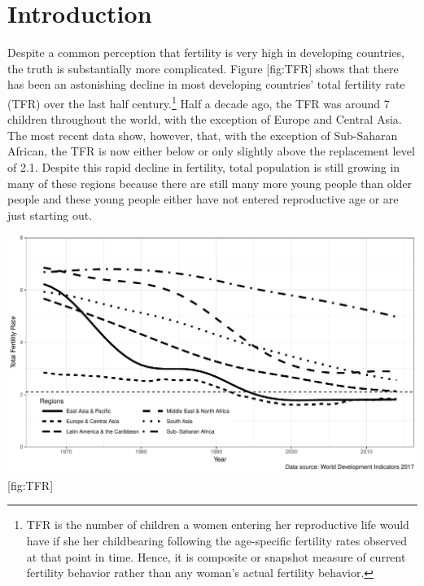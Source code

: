 \section{Introduction}\label{introduction}

Despite a common perception that fertility is very high in developing countries, the truth is substantially more complicated. Figure {[}fig:TFR{]} shows that there has been an astonishing decline in most developing countries' total fertility rate (TFR) over the last half century.\footnote{TFR is the number of children a women entering her reproductive life would have if she her childbearing following the age-specific fertility rates observed at that point in time. Hence, it is composite or snapshot measure of current fertility behavior rather than any woman's actual fertility behavior.} Half a decade ago, the TFR was around 7 children throughout the world, with the exception of Europe and Central Asia. The most recent data show, however, that, with the exception of Sub-Saharan African, the TFR is now either below or only slightly above the replacement level of 2.1. Despite this rapid decline in fertility, total population is still growing in many of these regions because there are still many more young people than older people and these young people either have not entered reproductive age or are just starting out.

\includegraphics{../figures/totalFertilityRatesBW.pdf} {[}fig:TFR{]}


